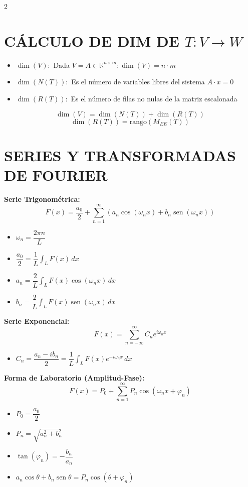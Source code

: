\documentclass[10pt]{extarticle}
\newenvironment{term}
  {\begin{minipage}{\linewidth}}
  {\end{minipage}\par}
\begin{document}
\begin{multicols}{2}
\begin{term}
\section*{CÁLCULO DE DIM DE $T:V\to W$}
\begin{itemize}
    \item $\dim(V):$ Dada $V=A\in\mathbb{R}^{n\times m}:\dim(V)=n\cdot m$
    \item $\dim(N(T)):$ Es el número de variables libres del sistema $A\cdot x=0$
    \item $\dim(R(T)):$ Es el número de filas no nulas de la matriz escalonada
\end{itemize}
$$\dim(V)=\dim(N(T))+\dim(R(T))$$
$$\dim(R(T)) = \mathrm{rango}(M_{EE}(T))$$
\end{term}

\begin{term}
\section*{SERIES Y TRANSFORMADAS DE FOURIER}
\textbf{Serie Trigonométrica:}
$$F(x) = \frac{a_0}{2} + \sum_{n=1}^{\infty} \left( a_n \cos(\omega_n x) + b_n \operatorname{sen}(\omega_n x) \right)$$
\begin{itemize}[leftmargin=1.2em]
\item $\omega_n = \dfrac{2\pi n}{L}$
\item $\dfrac{a_0}{2} = \dfrac{1}{L} \int_{L} F(x) \, dx$
\item $a_n = \dfrac{2}{L} \int_{L} F(x) \cos(\omega_n x) \, dx$
\item $b_n = \dfrac{2}{L} \int_{L} F(x) \operatorname{sen}(\omega_n x) \, dx$
\end{itemize}

\textbf{Serie Exponencial:}
$$F(x) = \sum_{n=-\infty}^{\infty} C_n e^{i \omega_n x}$$
\begin{itemize}[leftmargin=1.2em]
\item $C_n = \dfrac{a_n - i b_n}{2} = \dfrac{1}{L} \int_{L} F(x) e^{-i \omega_n x} \, dx$
\end{itemize}

\textbf{Forma de Laboratorio (Amplitud-Fase):}
$$F(x) = P_0 + \sum_{n=1}^{\infty} P_n \cos(\omega_n x + \varphi_n)$$
\begin{itemize}[leftmargin=1.2em]
\item $P_0 = \dfrac{a_0}{2}$
\item $P_n = \sqrt{a_n^2 + b_n^2}$
\item $\tan(\varphi_n) = -\dfrac{b_n}{a_n}$
\item $a_n \cos\theta + b_n \operatorname{sen}\theta = P_n \cos(\theta + \varphi_n)$
\end{itemize}
\end{term}


\end{multicols}
\end{document}
